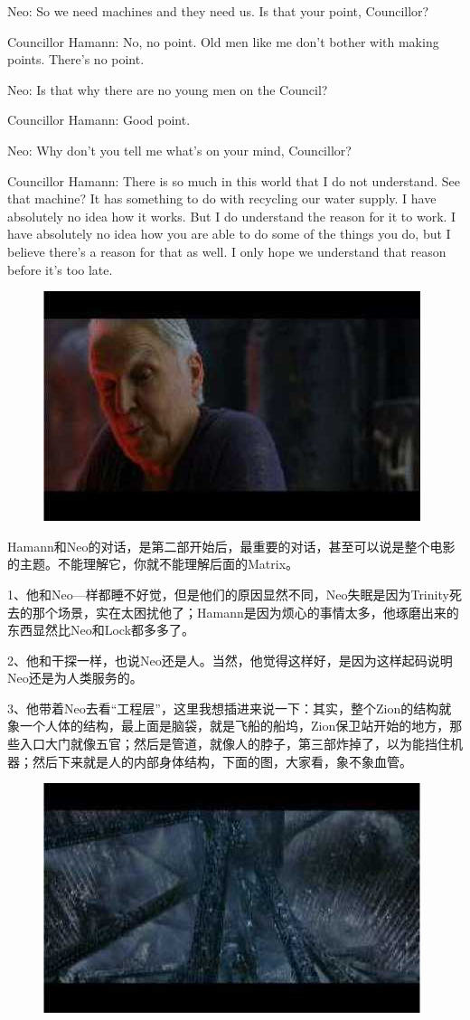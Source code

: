\documentclass{ctexart}
\newenvironment{myquote}{\color{green} \setlength{\leftskip}{6em} \setlength{\rightskip}{4em} \setlength{\parindent}{-2em}}{\par}
\begin{document}
\begin{myquote}
Neo: So we need machines and they need us. Is that your point, Councillor?

Councillor Hamann: No, no point. Old men like me don't bother with making points. There's no point.

Neo: Is that why there are no young men on the Council?

Councillor Hamann: Good point.

Neo: Why don't you tell me what's on your mind, Councillor?

Councillor Hamann: There is so much in this world that I do not understand. See that machine? It has something to do with recycling our water supply. I have absolutely no idea how it works. But I do understand the reason for it to work. I have absolutely no idea how you are able to do some of the things you do, but I believe there's a reason for that as well. I only hope we understand that reason before it's too late.
\end{myquote}

\begin{figure}[htb]
\centering
\includegraphics[width=0.5\linewidth]{fig/read_reloaded-50}
\end{figure}

Hamann和Neo的对话，是第二部开始后，最重要的对话，甚至可以说是整个电影的主题。不能理解它，你就不能理解后面的Matrix。

1、他和Neo—样都睡不好觉，但是他们的原因显然不同，Neo失眠是因为Trinity死去的那个场景，实在太困扰他了；Hamann是因为烦心的事情太多，他琢磨出来的东西显然比Neo和Lock都多多了。

2、他和干探一样，也说Neo还是人。当然，他觉得这样好，是因为这样起码说明Neo还是为人类服务的。

3、他带着Neo去看“工程层”，这里我想插进来说一下：其实，整个Zion的结构就象一个人体的结构，最上面是脑袋，就是飞船的船坞，Zion保卫站开始的地方，那些入口大门就像五官；然后是管道，就像人的脖子，第三部炸掉了，以为能挡住机器；然后下来就是人的内部身体结构，下面的图，大家看，象不象血管。

\begin{figure}[htb]
\centering
\includegraphics[width=0.5\linewidth]{fig/read_reloaded-51}
\end{figure}
\end{document}

